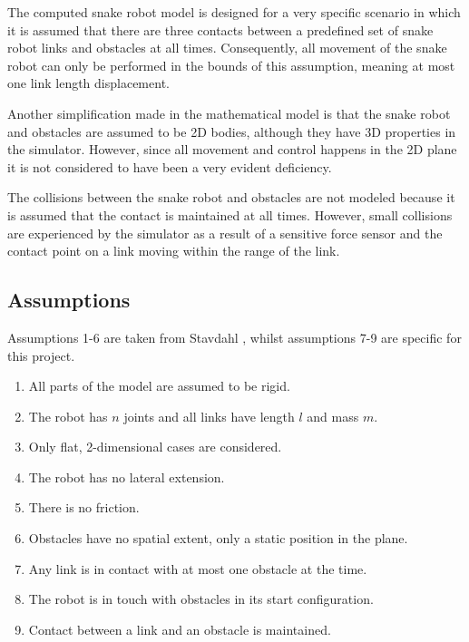 The computed snake robot model is designed for a very specific scenario in which it is assumed that there are three contacts between a predefined set of snake robot links and obstacles at all times. Consequently, all movement of the snake robot can only be performed in the bounds of this assumption, meaning at most one link length displacement.

Another simplification made in the mathematical model is that the snake robot and obstacles are assumed to be 2D bodies, although they have 3D properties in the simulator. However, since all movement and control happens in the 2D plane it is not considered to have been a very evident deficiency.

The collisions between the snake robot and obstacles are not modeled because it is assumed that the contact is maintained at all times. However, small collisions are experienced by the simulator as a result of a sensitive force sensor and the contact point on a link moving within the range of the link.


\subsection{Assumptions}\label{seq:assumptions}

Assumptions 1-6 are taken from Stavdahl \cite{StavdahlNote}, whilst assumptions 7-9 are specific for this project.

\begin{enumerate}
    \item All parts of the model are assumed to be rigid.
    \item The robot has $n$ joints and all links have length $l$ and mass $m$.
    \item Only flat, 2-dimensional cases are considered.
    \item The robot has no lateral extension.
    \item There is no friction. 
    \item Obstacles have no spatial extent, only a static position in the plane.
    \item Any link is in contact with at most one obstacle at the time.
    \item The robot is in touch with obstacles in its start configuration.
    \item Contact between a link and an obstacle is maintained.
\end{enumerate}

